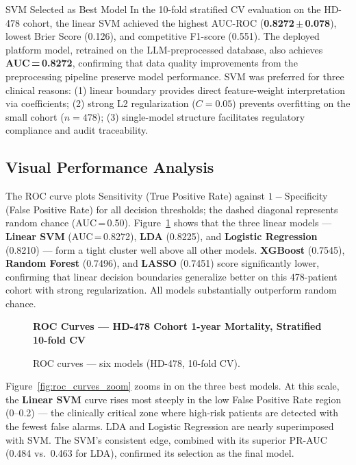 \documentclass[12pt,a4paper,twoside]{report}
\begin{document}
\begin{resultbox}{SVM Selected as Best Model}
In the 10-fold stratified CV evaluation on the HD-478 cohort, the linear SVM achieved the highest AUC-ROC (\textbf{0.8272\,$\pm$\,0.078}), lowest Brier Score (0.126), and competitive F1-score (0.551). The deployed platform model, retrained on the LLM-preprocessed database, also achieves \textbf{AUC\,=\,0.8272}, confirming that data quality improvements from the preprocessing pipeline preserve model performance. SVM was preferred for three clinical reasons: (1) linear boundary provides direct feature-weight interpretation via coefficients; (2) strong L2 regularization ($C=0.05$) prevents overfitting on the small cohort ($n=478$); (3) single-model structure facilitates regulatory compliance and audit traceability.
\end{resultbox}

\subsection{Visual Performance Analysis}

The ROC curve plots Sensitivity (True Positive Rate) against $1-$Specificity (False Positive Rate) for all decision thresholds; the dashed diagonal represents random chance (AUC\,=\,0.50). Figure~\ref{fig:roc_curves} shows that the three linear models --- \textbf{Linear SVM} (AUC\,=\,0.8272), \textbf{LDA} (0.8225), and \textbf{Logistic Regression} (0.8210) --- form a tight cluster well above all other models. \textbf{XGBoost} (0.7545), \textbf{Random Forest} (0.7496), and \textbf{LASSO} (0.7451) score significantly lower, confirming that linear decision boundaries generalize better on this 478-patient cohort with strong regularization. All models substantially outperform random chance.

\begin{figure}[htbp]
\centering
{\small\bfseries ROC Curves --- HD-478 Cohort \textbar{}
  1-year Mortality, Stratified 10-fold CV}\\[4pt]
\caption{ROC curves --- six models (HD-478, 10-fold CV).}
\label{fig:roc_curves}
\end{figure}

\FloatBarrier
Figure~\ref{fig:roc_curves_zoom} zooms in on the three best models. At this scale, the \textbf{Linear SVM} curve rises most steeply in the low False Positive Rate region (0--0.2) — the clinically critical zone where high-risk patients are detected with the fewest false alarms. LDA and Logistic Regression are nearly superimposed with SVM. The SVM's consistent edge, combined with its superior PR-AUC (0.484 vs.\ 0.463 for LDA), confirmed its selection as the final model.
\end{document}
